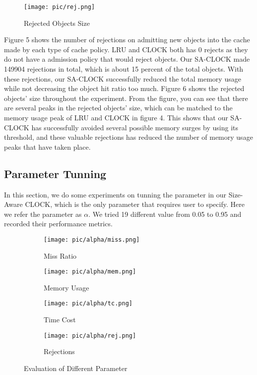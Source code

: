 \documentclass[conference]{IEEEtran}
\begin{document}
\begin{figure}[h]
\centerline{\texttt{[image: pic/rej.png]}}
\caption{Rejected Objects Size}
\label{fig}
\end{figure}

Figure 5 shows the number of rejections on admitting new objects into the cache made by each type of cache policy. LRU and CLOCK both has 0 rejects as they do not have a admission policy that would reject objects. Our SA-CLOCK made 149904 rejections in total, which is about 15 percent of the total objects. With these rejections, our SA-CLOCK successfully reduced the total memory usage while not decreasing the object hit ratio too much.
Figure 6 shows the rejected objects' size throughout the experiment. From the figure, you can see that there are several peaks in the rejected objects' size, which can be matched to the memory usage peak of LRU and CLOCK in figure 4. This shows that our SA-CLOCK has successfully avoided several possible memory surges by using its threshold, and these valuable rejections has reduced the number of memory usage peaks that have taken place. 


\subsection{Parameter Tunning}
In this section, we do some experiments on tunning the parameter in our Size-Aware CLOCK, which is the only parameter that requires user to specify. Here we refer the parameter as $\alpha$. We tried 19 different value from 0.05 to 0.95 and recorded their performance metrics.

\begin{figure}
  \centering
  \begin{subfigure}[h]{0.4\textwidth}
    \texttt{[image: pic/alpha/miss.png]}
    \caption{Miss Ratio}
    \label{fig:sub1}
  \end{subfigure}
  \hfill
  \begin{subfigure}[h]{0.4\textwidth}
    \texttt{[image: pic/alpha/mem.png]}
    \caption{Memory Usage}
    \label{fig:sub2}
  \end{subfigure}
  
  \medskip
  
  \begin{subfigure}[h]{0.4\textwidth}
    \texttt{[image: pic/alpha/tc.png]}
    \caption{Time Cost}
    \label{fig:sub3}
  \end{subfigure}
  \hfill
  \begin{subfigure}[h]{0.4\textwidth}
    \texttt{[image: pic/alpha/rej.png]}
    \caption{Rejections}
    \label{fig:sub4}
  \end{subfigure}
  
  \caption{Evaluation of Different Parameter}
  \label{fig:main} 
\end{figure}
\end{document}
